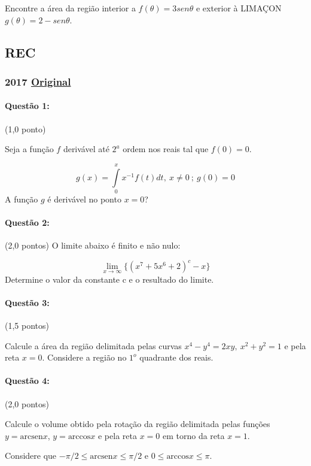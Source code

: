 \documentclass[12pt,a4paper]{article}
\newcommand{\original}[1]{\tiny \href{#1}{Original} \normalsize}
\begin{document}
Encontre a área da região interior a $f(\theta)=3sen\theta$ e exterior à LIMAÇON $g(\theta)=2-sen\theta$. 

\newpage

\subsection{REC}
\subsubsection{2017 \original{https://drive.google.com/file/d/138iTg3BISE04jMocXAkEXTX0s5qOXOgQ/view?usp=sharing}}

\paragraph{Questão 1:} (1,0 ponto)

Seja a função $f$ derivável até $2^a$ ordem nos reais tal que $f(0)=0$. 

$$ g(x)=\displaystyle\int\limits_0^x x^{-1}f(t)dt, \  x\neq 0 \ ; \ g(0)=0 $$
A função $g$ é derivável no ponto $x=0$?

\paragraph{Questão 2:}  (2,0 pontos)
O limite abaixo é finito e não nulo:

$$ \lim\limits_{x \rightarrow \infty} \{(x^7+5x^6+2)^c - x\} $$
Determine o valor da constante c e o resultado do limite.

\paragraph{Questão 3:} (1,5 pontos)

Calcule a área da região delimitada pelas curvas $x^4-y^4=2xy, \ x^2 +y^2=1$ e pela reta $x=0$. Considere a região no $1^o$ quadrante dos reais.

\paragraph{Questão 4:} (2,0 pontos)

Calcule o volume obtido pela rotação da região delimitada pelas funções $y=\textrm{arcsen}x$, $y=\textrm{arccos}x$ e pela reta $x=0$  em torno da reta $x=1$. 

Considere que $-\pi/2 \leq \textrm{arcsen}x \leq \pi/2$ e $0 \leq \textrm{arccos}x \leq \pi$. 
\end{document}
